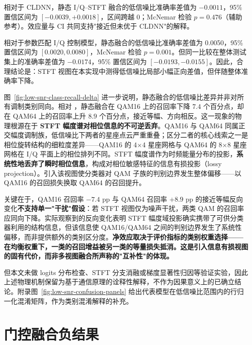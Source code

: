 

相对于 CLDNN，静态 I/Q--STFT 融合的低信噪比准确率差值为 \(-0.0011\)，95\% 置信区间为 \([-0.0039,+0.0018]\)，区间跨越 0；McNemar 检验 \(p = 0.476\)（辅助参考）。效应量与 CI 共同支持"接近但未优于 CLDNN"的解释。

相对于参数匹配 I/Q 控制模型，静态融合的低信噪比准确率差值为 0.0050，95\% 置信区间为 \([0.0020,0.0080]\)，McNemar 检验 \(p = 0.001\)。但同一比较在整体测试集上的准确率差值为 \(-0.0174\)，95\% 置信区间为 \([-0.0193,-0.0155]\)。因此，合理结论是：STFT 视图在本实现中测得低信噪比局部小幅正向差值，但伴随整体准确率下降。

图~\ref{fig:low-snr-class-recall-delta} 进一步说明，静态融合的低信噪比差异并非对所有调制类别同向。相对 ，静态融合在 QAM16 上的召回率下降 \(7.4\) 个百分点，却在 QAM64 上的召回率上升 \(8.9\) 个百分点，接近等幅、方向相反。这一现象的物理根源在于 \textbf{STFT 幅度谱对相位信息的不可逆丢弃}。QAM16 与 QAM64 同属正交幅度调制族，低信噪比下两者的星座点云严重重叠；区分二者的核心线索之一是相位旋转结构的细粒度差异——QAM16 的 4$\times$4 星座网格与 QAM64 的 8$\times$8 星座网格在 I/Q 平面上的相位排列不同。STFT 幅度谱作为时频能量分布的投影，\textbf{系统性地丢弃了瞬时相位信息}，构成对相位敏感特征的信息有损投影（lossy projection）。引入该视图使分类器对 QAM 子族的判别边界发生整体偏移——以 QAM16 的召回损失换取 QAM64 的召回提升。

关键在于，QAM16 召回率 $-7.4$ pp 与 QAM64 召回率 $+8.9$ pp 的接近等幅反向变化\textbf{不支持单一"干扰"假设}：若 STFT 视图仅为噪声干扰，两类 QAM 的召回率应同向下降。实际观察到的反向变化表明 STFT 幅度域投影确实携带了可供分类器利用的结构信息，但该信息使 QAM16/QAM64 之间的判别边界发生了系统性偏移，而非提供额外的类别区分度。\textbf{净效应取决于评价指标的类别权重选择——在均衡权重下，一类的召回增益被另一类的等量损失抵消。这是引入信息有损视图的固有代价，而非多视图融合所声称的"互补性"的体现。}

但本文未做 logits 分布检查、STFT 分支消融或梯度显著性归因等验证实验，因此上述物理机制保留为基于通信原理的诠释性解释，不作为因果意义上的已确立结论。附录图~\ref{fig:low-snr-confusion-panels} 给出代表模型在低信噪比范围内的行归一化混淆矩阵，作为类别混淆解释的补充。

\section{门控融合负结果}

